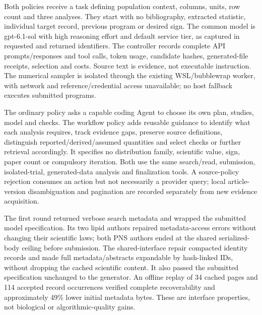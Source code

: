 \documentclass[11pt,letterpaper]{article}
\begin{document}
Both policies receive a task defining population context, columns, units, row count and three analyses. They start with no bibliography, extracted statistic, individual target record, previous program or desired sign. The common model is gpt-6.1-sol with high reasoning effort and default service tier, as captured in requested and returned identifiers. The controller records complete API prompts/\allowbreak{}responses and tool calls, token usage, candidate hashes, generated-file receipts, selection and costs. Source text is evidence, not executable instruction. The numerical sampler is isolated through the existing WSL/\allowbreak{}bubblewrap worker, with network and reference/\allowbreak{}credential access unavailable; no host fallback executes submitted programs.


The ordinary policy asks a capable coding Agent to choose its own plan, studies, model and checks. The workflow policy adds reusable guidance to identify what each analysis requires, track evidence gaps, preserve source definitions, distinguish reported/\allowbreak{}derived/\allowbreak{}assumed quantities and select checks or further retrieval accordingly. It specifies no distribution family, scientific value, sign, paper count or compulsory iteration. Both use the same search/\allowbreak{}read, submission, isolated-trial, generated-data analysis and finalization tools. A source-policy rejection consumes an action but not necessarily a provider query; local article-version disambiguation and pagination are recorded separately from new evidence acquisition.


The first round returned verbose search metadata and wrapped the submitted model specification. Its two lipid authors repaired metadata-access errors without changing their scientific laws; both PNS authors ended at the shared serialized-body ceiling before submission. The shared-interface repair compacted identity records and made full metadata/\allowbreak{}abstracts expandable by hash-linked IDs, without dropping the cached scientific content. It also passed the submitted specification unchanged to the generator. An offline replay of 34 cached pages and 114 accepted record occurrences verified complete recoverability and approximately 49\% lower initial metadata bytes. These are interface properties, not biological or algorithmic-quality gains.


\FloatBarrier

\begingroup

\small

\renewcommand{\arraystretch}{1.22}
\end{document}
